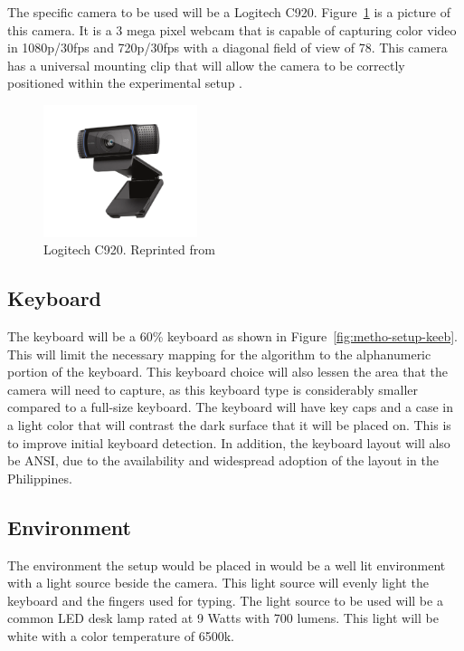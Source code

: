 \documentclass{report}
\begin{document}
The specific camera to be used will be a Logitech C920.
Figure~\ref{fig:metho-setup-cam} is a picture of this camera. It is a 3 mega pixel
webcam that is capable of capturing color video in 1080p/30fps and 720p/30fps
with a diagonal field of view of 78\degree. This camera has a universal mounting
clip that will allow the camera to be correctly positioned within the
experimental setup \parencite{logitech}.

\begin{figure}[H]
	\centering
	\includegraphics[width=0.4\textwidth]{webcam.png}
	\caption{Logitech C920. Reprinted from }
	\label{fig:metho-setup-cam}
	\centering
\end{figure}

\subsection{Keyboard}
\label{section:metho-keeb}

The keyboard will be a 60\% keyboard as shown in
Figure~\ref{fig:metho-setup-keeb}. This will limit the necessary mapping for the
algorithm to the alphanumeric portion of the keyboard. This keyboard choice will
also lessen the area that the camera will need to capture, as this keyboard type
is considerably smaller compared to a full-size keyboard. The keyboard will have
key caps and a case in a light color that will contrast the dark surface that it
will be placed on. This is to improve initial keyboard detection. In addition,
the keyboard layout will also be ANSI, due to the availability and widespread
adoption of the layout in the Philippines.

\subsection{Environment}
The environment the setup would be placed in would be a well lit environment
with a light source beside the camera. This light source will evenly light the
keyboard and the fingers used for typing. The light source to be used will be a
common LED desk lamp rated at 9 Watts with 700 lumens. This light will be white
with a color temperature of 6500k.
\end{document}
